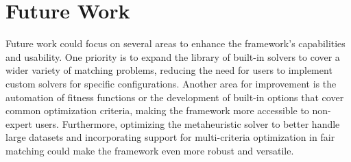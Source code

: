 \section{Future Work}
    Future work could focus on several areas to enhance the framework's capabilities and usability. One priority is to expand the library of built-in solvers to cover a wider variety of matching problems, reducing the need for users to implement custom solvers for specific configurations. Another area for improvement is the automation of fitness functions or the development of built-in options that cover common optimization criteria, making the framework more accessible to non-expert users. Furthermore, optimizing the metaheuristic solver to better handle large datasets and incorporating support for multi-criteria optimization in fair matching could make the framework even more robust and versatile.
